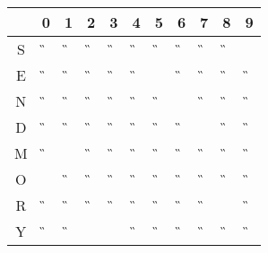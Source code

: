 \begin{tabular}{|c|c|c|c|c|c|c|c|c|c|c|}\hline
  & 0 & 1 & 2 & 3 & 4 & 5 & 6 & 7 & 8 & 9 \\ \hline
S &\G &\G &\G &\G &\G &\G &\G &\G &\G &\A \\ \hline
E &\G &\G &\G &\G &\G &\A &\G &\G &\G &\G \\ \hline
N &\G &\G &\G &\G &\G &\G &\A &\G &\G &\G \\ \hline
D &\G &\G &\G &\G &\G &\G &\G &\A &\G &\G \\ \hline
M &\G &\A &\G &\G &\G &\G &\G &\G &\G &\G \\ \hline
O &\A &\G &\G &\G &\G &\G &\G &\G &\G &\G \\ \hline
R &\G &\G &\G &\G &\G &\G &\G &\G &\A &\G \\ \hline
Y & \G&\G &\F &\X &\G &\G &\G &\G &\G &\G \\ \hline
\end{tabular}
